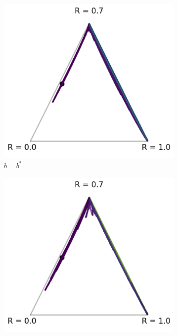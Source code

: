 \begin{figure}[!ht]
\begin{subfigure}[b]{0.245\linewidth}
    \includegraphics[width=\textwidth]{articles/baselines/figs/appendix_figs_3arm_033/vanilla_minvar_00.png}
    \caption{$b = b^\ast$}
  \end{subfigure}
  \begin{subfigure}[b]{0.245\linewidth}
    \includegraphics[width=\textwidth]{articles/baselines/figs/appendix_figs_3arm_033/vanilla_minvar_05.png}

\end{subfigure}
\end{figure}
